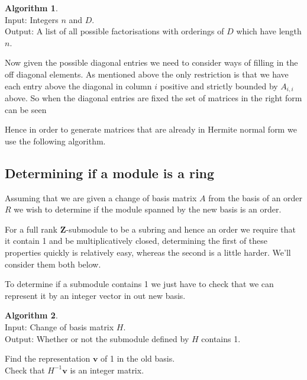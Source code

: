 \documentclass[12pt,a4paper,abstracton,bibtotoc]{scrreprt}
\theoremstyle{definition}
\newtheorem{alg}{Algorithm}
\newcommand{\ZZ}{\mathbf{Z}}
\begin{document}
\begin{alg}~\\
Input: Integers $n$ and $D$.\\
Output: A list of all possible factorisations with orderings of $D$ which have length $n$.\\
\begin{algorithm}[H]
\end{algorithm}
\end{alg}

Now given the possible diagonal entries we need to consider ways of filling in the off diagonal elements.
As mentioned above the only restriction is that we have each entry above the diagonal in column $i$ positive and strictly bounded by $A_{i,i}$ above.
So when the diagonal entries are fixed the set of matrices in the right form can be seen 

Hence in order to generate matrices that are already in Hermite normal form we use the following algorithm.

\subsection{Determining if a module is a ring}
Assuming that we are given a change of basis matrix $A$ from the basis of an order $R$ we wish to determine if the module spanned by the new basis is an order.

For a full rank $\ZZ$-submodule to be a subring and hence an order we require that it contain 1 and be multiplicatively closed, determining the first of these properties quickly is relatively easy, whereas the second is a little harder.
We'll consider them both below.

To determine if a submodule contains 1 we just have to check that we can represent it by an integer vector in out new basis.

\begin{alg}\label{alg:hasone}~\\ %
Input: Change of basis matrix $H$.\\
Output: Whether or not the submodule defined by $H$ contains 1.\\
\begin{algorithm}[H]
Find the representation $\mathbf v$ of 1 in the old basis.\\
Check that $H^{-1}\mathbf v$ is an integer matrix.\\
\end{algorithm}
\end{alg}
\end{document}
